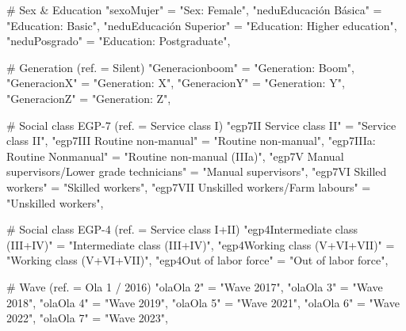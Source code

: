 \documentclass[
  spanish,
  a4paper,
  oneside]{scrbook}
\newenvironment{Shaded}{\begin{snugshade}}{\end{snugshade}}
\newcommand{\CommentTok}[1]{\textcolor[rgb]{0.37,0.37,0.37}{#1}}
\newcommand{\NormalTok}[1]{\textcolor[rgb]{0.00,0.23,0.31}{#1}}
\newcommand{\OtherTok}[1]{\textcolor[rgb]{0.00,0.23,0.31}{#1}}
\newcommand{\StringTok}[1]{\textcolor[rgb]{0.13,0.47,0.30}{#1}}
\begin{document}
\begin{Shaded}
\begin{Highlighting}[]
  \CommentTok{\# Sex \& Education}
  \StringTok{"sexoMujer"}              \OtherTok{=} \StringTok{"Sex: Female"}\NormalTok{,}
  \StringTok{"neduEducación Básica"}   \OtherTok{=} \StringTok{"Education: Basic"}\NormalTok{,}
  \StringTok{"neduEducación Superior"} \OtherTok{=} \StringTok{"Education: Higher education"}\NormalTok{,}
  \StringTok{"neduPosgrado"}           \OtherTok{=} \StringTok{"Education: Postgraduate"}\NormalTok{,}

  \CommentTok{\# Generation (ref. = Silent)}
  \StringTok{"Generacionboom"}         \OtherTok{=} \StringTok{"Generation: Boom"}\NormalTok{,}
  \StringTok{"GeneracionX"}            \OtherTok{=} \StringTok{"Generation: X"}\NormalTok{,}
  \StringTok{"GeneracionY"}            \OtherTok{=} \StringTok{"Generation: Y"}\NormalTok{,}
  \StringTok{"GeneracionZ"}            \OtherTok{=} \StringTok{"Generation: Z"}\NormalTok{,}

  \CommentTok{\# Social class EGP{-}7 (ref. = Service class I)}
  \StringTok{"egp7\textquotesingle{}II  Service class II\textquotesingle{}"}                           \OtherTok{=} \StringTok{"Service class II"}\NormalTok{,}
  \StringTok{"egp7\textquotesingle{}III Routine non{-}manual\textquotesingle{}"}                         \OtherTok{=} \StringTok{"Routine non{-}manual"}\NormalTok{,}
  \StringTok{"egp7\textquotesingle{}IIIa: Routine Nonmanual\textquotesingle{}"}                        \OtherTok{=} \StringTok{"Routine non{-}manual (IIIa)"}\NormalTok{,}
  \StringTok{"egp7\textquotesingle{}V   Manual supervisors/Lower grade technicians\textquotesingle{}"} \OtherTok{=} \StringTok{"Manual supervisors"}\NormalTok{,}
  \StringTok{"egp7\textquotesingle{}VI  Skilled workers\textquotesingle{}"}                            \OtherTok{=} \StringTok{"Skilled workers"}\NormalTok{,}
  \StringTok{"egp7\textquotesingle{}VII Unskilled workers/Farm labours\textquotesingle{}"}             \OtherTok{=} \StringTok{"Unskilled workers"}\NormalTok{,}

  \CommentTok{\# Social class EGP{-}4 (ref. = Service class I+II)}
  \StringTok{"egp4Intermediate class (III+IV)"}                    \OtherTok{=} \StringTok{"Intermediate class (III+IV)"}\NormalTok{,}
  \StringTok{"egp4Working class (V+VI+VII)"}                       \OtherTok{=} \StringTok{"Working class (V+VI+VII)"}\NormalTok{,}
  \StringTok{"egp4Out of labor force"}                             \OtherTok{=} \StringTok{"Out of labor force"}\NormalTok{,}

  \CommentTok{\# Wave (ref. = Ola 1 / 2016)}
  \StringTok{"olaOla 2"} \OtherTok{=} \StringTok{"Wave 2017"}\NormalTok{,}
  \StringTok{"olaOla 3"} \OtherTok{=} \StringTok{"Wave 2018"}\NormalTok{,}
  \StringTok{"olaOla 4"} \OtherTok{=} \StringTok{"Wave 2019"}\NormalTok{,}
  \StringTok{"olaOla 5"} \OtherTok{=} \StringTok{"Wave 2021"}\NormalTok{,}
  \StringTok{"olaOla 6"} \OtherTok{=} \StringTok{"Wave 2022"}\NormalTok{,}
  \StringTok{"olaOla 7"} \OtherTok{=} \StringTok{"Wave 2023"}\NormalTok{,}


\end{Highlighting}
\end{Shaded}
\end{document}
